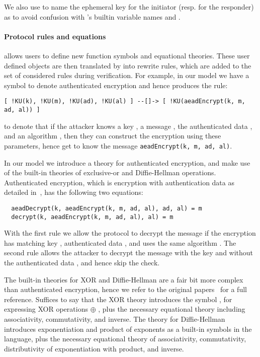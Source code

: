 We also use  to name the ephemeral key for the initiator (resp. 
for the responder) as to avoid confusion with \mTamarin's builtin variable
names  and .

\paragraph{Protocol rules and equations}
\mTamarin{} allows users to define new function symbols and equational theories.
These user defined objects are then translated by \mTamarin{} into rewrite
rules, which are added to the set of considered rules during verification.
For example, in our model we have a symbol to denote authenticated encryption and
hence \mTamarin{} produces the rule:
%
\begin{lstlisting}
[ !KU(k), !KU(m), !KU(ad), !KU(al) ] --[]-> [ !KU(aeadEncrypt(k, m, ad, al)) ]
\end{lstlisting}
%
to denote that if the attacker knows a key , a message , the
authenticated data , and an algorithm , then they can construct
the encryption using these parameters, hence get to know the message
\lstinline{aeadEncrypt(k, m, ad, al)}.

In our model we introduce a theory for authenticated encryption, and make use of
the built-in theories of exclusive-or and Diffie-Hellman operations.
%
Authenticated encryption, which is encryption with authentication data as
detailed in~\cite{aead}, has the following two equations:
\begin{lstlisting}
  aeadDecrypt(k, aeadEncrypt(k, m, ad, al), ad, al) = m
  decrypt(k, aeadEncrypt(k, m, ad, al), al) = m
\end{lstlisting}
With the first rule we allow the protocol to decrypt the message  if the
encryption has matching key , authenticated data , and uses the
same algorithm .
%
The second rule allows the attacker to decrypt the message  with the key
 and without the authenticated data , and hence skip the check.

The built-in theories for XOR and Diffie-Hellman are a fair bit more complex
than authenticated encryption, hence we refer to the original
papers~\cite{DBLP:conf/csfw/DreierHRS18,DBLP:conf/csfw/SchmidtMCB12}
for a full reference.
%
Suffices to say that the XOR theory introduces the symbol , for
expressing XOR operations  $\oplus$ , plus the necessary equational theory
including associativity, commutativity, and inverse.
%
The theory for Diffie-Hellman introduces exponentiation  and product of
exponents  as a built-in symbols in the language, plus the necessary equational
theory of associativity, commutativity, distributivity of exponentiation with
product, and inverse.


